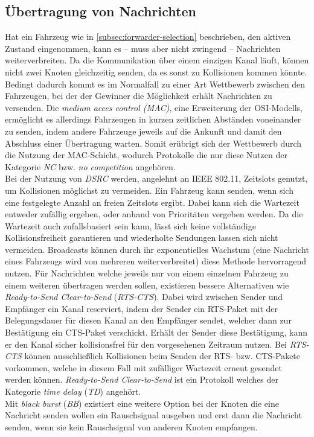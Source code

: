 \documentclass[english,runningheads,a4paper]{llncs}[2018/03/10]
\begin{document}
\subsection{Übertragung von Nachrichten}
Hat ein Fahrzeug wie in \ref{subsec:forwarder-selection} beschrieben, den aktiven Zustand eingenommen, kann es – muss aber nicht zwingend – Nachrichten weiterverbreiten.
Da die Kommunikation über einem einzigen Kanal läuft, können nicht zwei Knoten gleichzeitig senden, da es sonst zu Kollisionen kommen könnte.
Bedingt dadurch kommt es im Normalfall zu einer Art Wettbewerb zwischen den Fahrzeugen, bei der der Gewinner die Möglichkeit erhält Nachrichten zu versenden.
Die \textit{medium acces control (MAC)}, eine Erweiterung der OSI-Modells, ermöglicht es allerdings Fahrzeugen in kurzen zeitlichen Abständen voneinander zu senden, indem andere Fahrzeuge jeweils auf die Ankunft und damit den Abschluss einer Übertragung warten.
Somit erübrigt sich der Wettbewerb durch die Nutzung der MAC-Schicht, wodurch Protokolle die nur diese Nutzen der Kategorie \textit{NC} bzw. \textit{no competition} angehören.\\
Bei der Nutzung von \textit{DSRC} werden, angelehnt an IEEE 802.11, Zeitslots genutzt, um Kollisionen möglichst zu vermeiden.
Ein Fahrzeug kann senden, wenn sich eine festgelegte Anzahl an freien Zeitslots ergibt.
Dabei kann sich die Wartezeit entweder zufällig ergeben, oder anhand von Prioritäten vergeben werden.
Da die Wartezeit auch zufallsbasiert sein kann, lässt sich keine vollständige Kollisionsfreiheit garantieren und wiederholte Sendungen lassen sich nicht vermeiden.
Broadcasts können durch ihr exponentielles Wachstum (eine Nachricht eines Fahrzeugs wird von mehreren weiterverbreitet) diese Methode hervorragend nutzen.
Für Nachrichten welche jeweils nur von einem einzelnen Fahrzeug zu einem weiteren übertragen werden sollen, existieren bessere Alternativen wie \textit{Ready-to-Send Clear-to-Send} (\textit{RTS-CTS}).
Dabei wird zwischen Sender und Empfänger ein Kanal reserviert, indem der Sender ein RTS-Paket mit der Belegungsdauer für diesen Kanal an den Empfänger sendet, welcher dann zur Bestätigung ein CTS-Paket verschickt.
Erhält der Sender diese Bestätigung, kann er den Kanal sicher kollisionsfrei für den vorgesehenen Zeitraum nutzen.
Bei \textit{RTS-CTS} können ausschließlich Kollisionen beim Senden der RTS- bzw. CTS-Pakete vorkommen, welche in diesem Fall mit zufälliger Wartezeit erneut gesendet werden können.
\textit{Ready-to-Send Clear-to-Send} ist ein Protokoll welches der Kategorie \textit{time delay} (\textit{TD}) angehört.\\
Mit \textit{black burst} (\textit{BB}) existiert eine weitere Option bei der Knoten die eine Nachricht senden wollen ein Rauschsignal ausgeben und erst dann die Nachricht senden, wenn sie kein Rauschsignal von anderen Knoten empfangen.
\end{document}
